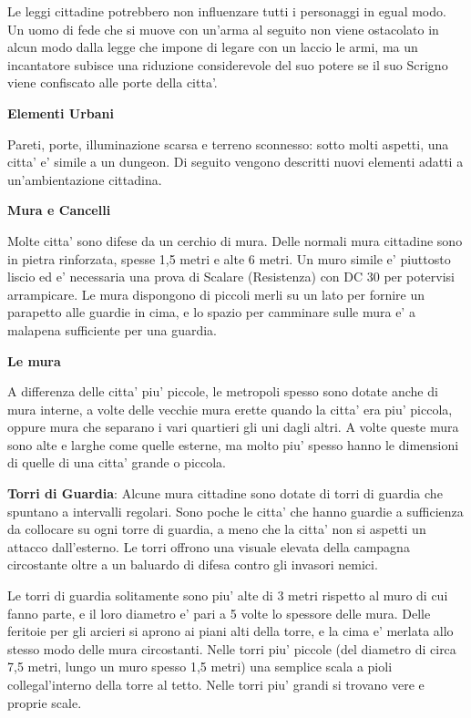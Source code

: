 \documentclass[a4paper,11pt,twoside,openany]{dndbook}
\begin{document}
{Le leggi cittadine potrebbero non influenzare tutti i personaggi in egual modo. Un uomo di fede che si muove con un'arma al seguito non viene ostacolato in alcun modo dalla legge che impone di legare con un laccio le armi, ma un incantatore subisce una riduzione considerevole del suo potere se il suo Scrigno viene confiscato alle porte della citta'.

\textbf{Elementi Urbani}

Pareti, porte, illuminazione scarsa e terreno sconnesso: sotto molti aspetti, una citta' e' simile a un dungeon. Di seguito vengono descritti nuovi elementi adatti a un'ambientazione cittadina.

\textbf{Mura e Cancelli}

Molte citta' sono difese da un cerchio di mura. Delle normali mura cittadine sono in pietra rinforzata, spesse 1,5 metri e alte 6 metri. Un muro simile e' piuttosto liscio ed e' necessaria una prova di Scalare (Resistenza) con DC 30 per potervisi arrampicare. Le mura dispongono di piccoli merli su un lato per fornire un parapetto alle guardie in cima, e lo spazio per camminare sulle mura e' a malapena sufficiente per una guardia.

\textbf{Le mura}

A differenza delle citta' piu' piccole, le metropoli spesso sono dotate anche di mura interne, a volte delle vecchie mura erette quando la citta' era piu' piccola, oppure mura che separano i vari quartieri gli uni dagli altri. A volte queste mura sono alte e larghe come quelle esterne, ma molto piu' spesso hanno le dimensioni di quelle di una citta' grande o piccola.

\textbf{Torri di Guardia}: Alcune mura cittadine sono dotate di torri di guardia che spuntano a intervalli regolari. Sono poche le citta' che hanno guardie a sufficienza da collocare su ogni torre di guardia, a meno che la citta' non si aspetti un attacco dall'esterno. Le torri offrono una visuale elevata della campagna circostante oltre a un baluardo di difesa contro gli invasori nemici.

Le torri di guardia solitamente sono piu' alte di 3 metri rispetto al muro di cui fanno parte, e il loro diametro e' pari a 5 volte lo spessore delle mura. Delle feritoie per gli arcieri si aprono ai piani alti della torre, e la cima e' merlata allo stesso modo delle mura circostanti. Nelle torri piu' piccole (del diametro di circa 7,5 metri, lungo un muro spesso 1,5 metri) una semplice scala a pioli collegal'interno della torre al tetto. Nelle torri piu' grandi si trovano vere e proprie scale.

}
\end{document}
